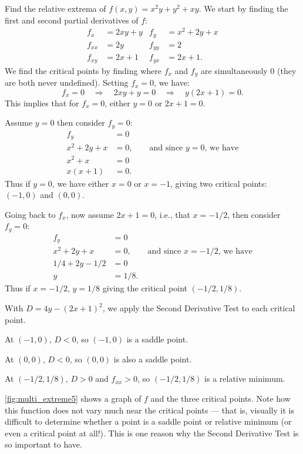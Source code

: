 \begin{example}\label{ex_multi_extreme5}%
Find the relative extrema of $f(x,y) = x^2y+y^2+xy$.
\solution
We start by finding the first and second partial derivatives of $f$:
\begin{align*}
f_x &= 2xy+y & f_y &= x^2+2y+x \\
f_{xx} &= 2y & f_{yy} &= 2\\
f_{xy} &= 2x+1 & f_{yx} &= 2x+1.
\end{align*}
We find the critical points by finding where $f_x$ and $f_y$ are simultaneously 0 (they are both never undefined). Setting $f_x=0$, we have:
\[f_x=0 \quad \Rightarrow \quad 2xy+y=0\quad \Rightarrow \quad y(2x+1)=0.\]
This implies that for $f_x=0$, either $y=0$ or $2x+1=0$.

Assume $y=0$ then consider $f_y=0$:
\begin{align*}
f_y &= 0\\
x^2+2y+x &= 0,  \qquad \text{and since $y=0$, we have}\\
x^2+x &= 0\\
x(x+1) & = 0.
\end{align*}
Thus if $y=0$, we have either $x=0$ or $x=-1$, giving two critical points: $(-1,0)$ and $(0,0)$. 

Going back to $f_x$, now assume $2x+1=0$, i.e., that $x=-1/2$, then consider $f_y=0$:
\begin{align*}
f_y &= 0\\
x^2+2y+x &= 0,  \qquad \text{and since $x=-1/2$, we have}\\
1/4+2y-1/2 &= 0\\
y&= 1/8.
\end{align*}
Thus if $x=-1/2$, $y=1/8$ giving the critical point $(-1/2,1/8)$. 

With $D = 4y-(2x+1)^2$, we apply the Second Derivative Test to each critical point.

At $(-1,0)$, $D <0$, so $(-1,0)$ is a saddle point.

At $(0,0)$, $D<0$, so $(0,0)$ is also a saddle point.

At $(-1/2,1/8)$, $D>0$ and $f_{xx} > 0$, so $(-1/2,1/8)$ is a relative minimum.

\autoref{fig:multi_extreme5} shows a graph of $f$ and the three critical points. Note how this function does not vary much near the critical points --- that is, visually it is difficult to determine whether a point is a saddle point or relative minimum (or even a critical point at all!). This is one reason why the Second Derivative Test is so important to have.
\end{example}

